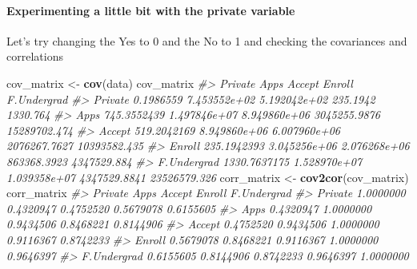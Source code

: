 \documentclass[]{article}
\newenvironment{Shaded}{\begin{snugshade}}{\end{snugshade}}
\newcommand{\CommentTok}[1]{\textcolor[rgb]{0.56,0.35,0.01}{\textit{#1}}}
\newcommand{\DecValTok}[1]{\textcolor[rgb]{0.00,0.00,0.81}{#1}}
\newcommand{\KeywordTok}[1]{\textcolor[rgb]{0.13,0.29,0.53}{\textbf{#1}}}
\newcommand{\NormalTok}[1]{#1}
\newcommand{\OperatorTok}[1]{\textcolor[rgb]{0.81,0.36,0.00}{\textbf{#1}}}
\newcommand{\StringTok}[1]{\textcolor[rgb]{0.31,0.60,0.02}{#1}}
\let\oldparagraph\paragraph
\renewcommand{\paragraph}[1]{\oldparagraph{#1}\mbox{}}
\begin{document}
\hypertarget{experimenting-a-little-bit-with-the-private-variable}{%
\paragraph{Experimenting a little bit with the private
variable}\label{experimenting-a-little-bit-with-the-private-variable}}

Let's try changing the Yes to 0 and the No to 1 and checking the
covariances and correlations

\begin{Shaded}
\end{Shaded}

\begin{Shaded}
\begin{Highlighting}[]
\NormalTok{cov_matrix <-}\StringTok{ }\KeywordTok{cov}\NormalTok{(data)}
\NormalTok{cov_matrix}
\CommentTok{#>                  Private         Apps       Accept       Enroll  F.Undergrad}
\CommentTok{#> Private        0.1986559 7.453552e+02 5.192042e+02     235.1942     1330.764}
\CommentTok{#> Apps         745.3552439 1.497846e+07 8.949860e+06 3045255.9876 15289702.474}
\CommentTok{#> Accept       519.2042169 8.949860e+06 6.007960e+06 2076267.7627 10393582.435}
\CommentTok{#> Enroll       235.1942393 3.045256e+06 2.076268e+06  863368.3923  4347529.884}
\CommentTok{#> F.Undergrad 1330.7637175 1.528970e+07 1.039358e+07 4347529.8841 23526579.326}
\NormalTok{corr_matrix <-}\StringTok{ }\KeywordTok{cov2cor}\NormalTok{(cov_matrix)}
\NormalTok{corr_matrix}
\CommentTok{#>               Private      Apps    Accept    Enroll F.Undergrad}
\CommentTok{#> Private     1.0000000 0.4320947 0.4752520 0.5679078   0.6155605}
\CommentTok{#> Apps        0.4320947 1.0000000 0.9434506 0.8468221   0.8144906}
\CommentTok{#> Accept      0.4752520 0.9434506 1.0000000 0.9116367   0.8742233}
\CommentTok{#> Enroll      0.5679078 0.8468221 0.9116367 1.0000000   0.9646397}
\CommentTok{#> F.Undergrad 0.6155605 0.8144906 0.8742233 0.9646397   1.0000000}
\end{Highlighting}
\end{Shaded}
\end{document}
